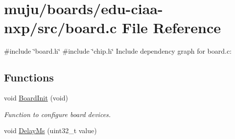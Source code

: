 \hypertarget{edu-ciaa-nxp_2src_2board_8c}{}\section{muju/boards/edu-\/ciaa-\/nxp/src/board.c File Reference}
\label{edu-ciaa-nxp_2src_2board_8c}
{\ttfamily \#include \char`\"{}board.\+h\char`\"{}}\newline
{\ttfamily \#include \char`\"{}chip.\+h\char`\"{}}\newline
Include dependency graph for board.\+c\+:
\subsection*{Functions}
\begin{DoxyCompactItemize}
\item 
void \hyperlink{group__hal_gad24575a3bcf2c2433e7720830d813e64}{Board\+Init} (void)
\begin{DoxyCompactList}\small\item\em Function to configure board devices. \end{DoxyCompactList}\item 
void \hyperlink{group__hal_gace922d758774792e0573b7c568fe2a3f}{Delay\+Ms} (uint32\+\_\+t value)
\end{DoxyCompactItemize}
